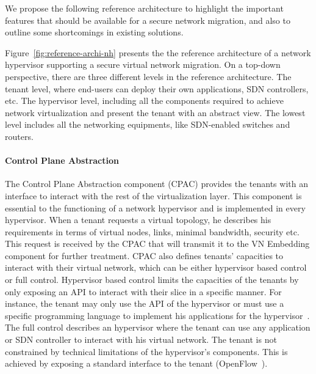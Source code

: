 We propose the following reference architecture to highlight the important features that should be available for a secure network migration, and also to outline some shortcomings in existing solutions.


  
Figure~\ref{fig:reference-archi-nh} presents the the reference architecture of a network hypervisor supporting a secure virtual network migration.
On a top-down perspective, there are three different levels in the reference architecture.
The tenant level, where end-users can deploy their own applications, SDN controllers, etc.
The hypervisor level, including all the components required to achieve network virtualization and present the tenant with an abstract view.
The lowest level includes all the networking equipments, like SDN-enabled switches and routers.

\paragraph{Control Plane Abstraction}
The Control Plane Abstraction component (CPAC) provides the tenants with an interface to interact with the rest of the virtualization layer.
This component is essential to the functioning of a network hypervisor and is implemented in every hypervisor.
When a tenant requests a virtual topology, he describes his requirements in terms of virtual nodes, links, minimal bandwidth, security etc. This request is received by the CPAC that will transmit it to the VN Embedding component for further treatment.
CPAC also defines tenants' capacities to interact with their virtual network, which can be either hypervisor based control or full control.
Hypervisor based control limits the capacities of the tenants by only exposing an API to interact with their slice in a specific manner. For instance, the tenant may only use the API of the hypervisor or must use a specific programming language to implement his applications for the hypervisor~\cite{FlowN-Drutskoy2012,NetworkHypervisor-Huang2013}. 
The full control describes an hypervisor where the tenant can use any application or SDN controller to interact with his virtual network. The tenant is not constrained by technical limitations of the hypervisor's components.
This is achieved by exposing a standard interface to the tenant (\eg OpenFlow~\cite{Openflow-McKeown2008}).



